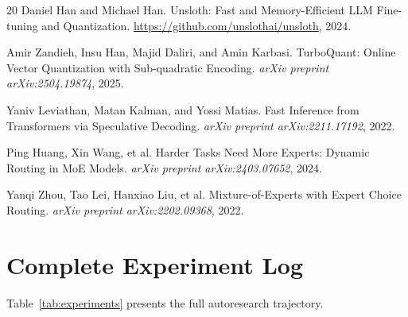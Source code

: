 \documentclass[11pt,twocolumn]{article}
\begin{document}
\begin{thebibliography}{20}
Daniel Han and Michael Han.
\newblock Unsloth: Fast and Memory-Efficient LLM Fine-tuning and Quantization.
\newblock \url{https://github.com/unslothai/unsloth}, 2024.

Amir Zandieh, Insu Han, Majid Daliri, and Amin Karbasi.
\newblock TurboQuant: Online Vector Quantization with Sub-quadratic Encoding.
\newblock \emph{arXiv preprint arXiv:2504.19874}, 2025.

Yaniv Leviathan, Matan Kalman, and Yossi Matias.
\newblock Fast Inference from Transformers via Speculative Decoding.
\newblock \emph{arXiv preprint arXiv:2211.17192}, 2022.

Ping Huang, Xin Wang, et al.
\newblock Harder Tasks Need More Experts: Dynamic Routing in MoE Models.
\newblock \emph{arXiv preprint arXiv:2403.07652}, 2024.

Yanqi Zhou, Tao Lei, Hanxiao Liu, et al.
\newblock Mixture-of-Experts with Expert Choice Routing.
\newblock \emph{arXiv preprint arXiv:2202.09368}, 2022.

\end{thebibliography}

\appendix

\section{Complete Experiment Log}

Table~\ref{tab:experiments} presents the full autoresearch trajectory.
\end{document}
